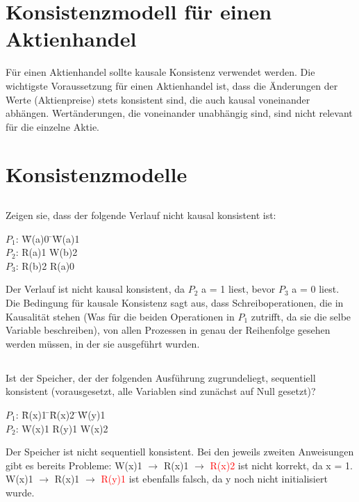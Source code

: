 \documentclass[a4paper,9pt]{article}
\begin{document}
\section{Konsistenzmodell f\"ur einen Aktienhandel}
F\"ur einen Aktienhandel sollte kausale Konsistenz verwendet werden. Die wichtigste Voraussetzung f\"ur einen Aktienhandel ist, dass die \"Anderungen der Werte (Aktienpreise) stets konsistent sind, die auch kausal voneinander abh\"angen. Wert\"anderungen, die voneinander unabh\"angig sind, sind nicht relevant f\"ur die einzelne Aktie. 

\section{Konsistenzmodelle}
\subsection{}
Zeigen sie, dass der folgende Verlauf nicht kausal konsistent ist:

\begin{tabbing}
$P_{1}$: \= W(a)0 \= \quad \= W(a)1 \\
$P_{2}$: \> R(a)1 \> \quad \> W(b)2 \\
$P_{3}$: \> R(b)2 \> \quad \> R(a)0
\end{tabbing}

Der Verlauf ist nicht kausal konsistent, da $P_{2}$ a = 1 liest, bevor $P_{3}$ a = 0 liest. Die Bedingung f\"ur kausale Konsistenz sagt aus, dass Schreiboperationen, die in Kausalit\"at stehen (Was f\"ur die beiden Operationen in $P_{1}$ zutrifft, da sie die selbe Variable beschreiben), von allen Prozessen in genau der Reihenfolge gesehen werden m\"ussen, in der sie ausgef\"uhrt wurden.

\subsection{}
Ist der Speicher, der der folgenden Ausf\"uhrung zugrundeliegt, sequentiell konsistent (vorausgesetzt, alle Variablen sind zun\"achst auf Null gesetzt)?

\begin{tabbing}
$P_{1}$: \= R(x)1 \= \quad \= R(x)2 \= \quad \= W(y)1 \\
$P_{2}$: \> W(x)1 \> \quad \> R(y)1 \> \quad \> W(x)2
\end{tabbing}

Der Speicher ist nicht sequentiell konsistent. Bei den jeweils zweiten Anweisungen gibt es bereits Probleme: \newline
W(x)1 $\rightarrow$ R(x)1 $\rightarrow$ \textcolor{red}{R(x)2} ist nicht korrekt, da x = 1. \newline
W(x)1 $\rightarrow$ R(x)1 $\rightarrow$ \textcolor{red}{R(y)1} ist ebenfalls falsch, da y noch nicht initialisiert wurde.
\end{document}
